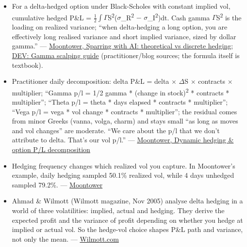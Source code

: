 \documentclass{article}
\begin{document}
\begin{itemize}

\item For a delta-hedged option under Black-Scholes with constant implied vol, cumulative hedged P\&L = \ensuremath{\frac12}\ensuremath{\int}\ensuremath{\Gamma}S\textsuperscript{2}(\ensuremath{\sigma}\_R\textsuperscript{2} \ensuremath{-} \ensuremath{\sigma}\_I\textsuperscript{2})dt. Cash gamma \ensuremath{\Gamma}S\textsuperscript{2} is the loading on realized variance; ``when delta-hedging a long option, you are effectively long realised variance and short implied variance, sized by dollar gamma.'' --- \href{https://moontowermeta.com/sparring-with-ai-theoretical-options-p-l-vs-discrete-hedging/}{Moontower, Sparring with AI: theoretical vs discrete hedging}; \href{https://dev.to/tomasz_dobrowolski_35d32c/gamma-scalping-the-complete-guide-to-delta-hedged-straddle-pl-ogo}{DEV: Gamma scalping guide} (practitioner/\allowbreak{}blog sources; the formula itself is textbook).

\item Practitioner daily decomposition: delta P\&L = delta \ensuremath{\times} \ensuremath{\Delta}S \ensuremath{\times} contracts \ensuremath{\times} multiplier; ``Gamma p/\allowbreak{}l = 1/\allowbreak{}2 gamma * (change in stock)\textsuperscript{2} * contracts * multiplier''; ``Theta p/\allowbreak{}l = theta * days elapsed * contracts * multiplier''; ``Vega p/\allowbreak{}l = vega * vol change * contracts * multiplier''; the residual comes from minor Greeks (vanna, volga, charm) and stays small ``as long as moves and vol changes'' are moderate. ``We care about the p/\allowbreak{}l that we don't attribute to delta. That's our vol p/\allowbreak{}l.'' --- \href{https://moontower.ai/blog/dynamic-hedging-option-p-l-decomposition}{Moontower, Dynamic hedging \& option P/\allowbreak{}L decomposition}

\item Hedging frequency changes which realized vol you capture. In Moontower's example, daily hedging sampled 50.1\% realized vol, while 4 days unhedged sampled 79.2\%. --- \href{https://moontower.ai/blog/dynamic-hedging-option-p-l-decomposition}{Moontower}

\item Ahmad \& Wilmott (Wilmott magazine, Nov 2005) analyse delta hedging in a world of three volatilities: implied, actual and hedging. They derive the expected profit and the variance of profit depending on whether you hedge at implied or actual vol. So the hedge-vol choice shapes P\&L path and variance, not only the mean. --- \href{https://www.wilmott.com/which-free-lunch-would-you-like-today-sir-delta-hedging-volatility-arbitrage-and-optimal-portfolios-riaz-ahmad-and-paul-wilmott/}{Wilmott.com}


\end{itemize}
\end{document}
